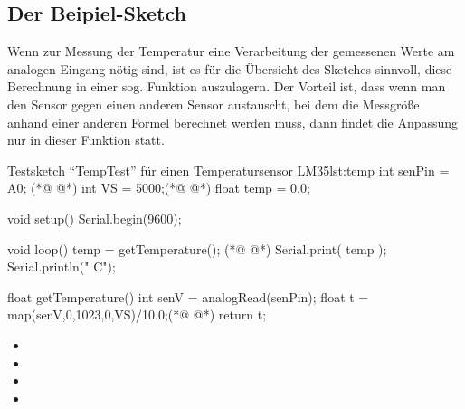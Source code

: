 \subsection{Der Beipiel-Sketch} 

Wenn zur Messung der Temperatur eine Verarbeitung der gemessenen Werte am analogen Eingang nötig sind, ist es für die Übersicht des Sketches sinnvoll, diese Berechnung in einer sog. Funktion auszulagern. Der Vorteil ist, dass wenn man den Sensor gegen einen anderen Sensor austauscht, bei dem die Messgröße anhand einer anderen Formel berechnet werden muss, dann findet die Anpassung nur in dieser Funktion statt.     

\begin{multicols}{2}
\begin{arduinoCode}{Testsketch ``TempTest'' für einen Temperatursensor LM35}{lst:temp}
int senPin = A0; (*@  @*)
int VS = 5000;(*@  @*)
float temp = 0.0; 
 
void setup() {
  Serial.begin(9600);
}
 
void loop() {
  temp =  getTemperature(); (*@  @*)
  Serial.print( temp );
  Serial.println(" C");
}
 
float getTemperature() { 
  int senV = analogRead(senPin); 
  float t = map(senV,0,1023,0,VS)/10.0;(*@ @*)
  return t;
}
\end{arduinoCode}

\vfill\null 
\columnbreak

\null\vfill
\begin{itemize}
  \itemsep15pt
    \item[] 
    \item[] 
    \itemsep35pt
    \item[] 
    \itemsep45pt
    \item[] 
\end{itemize}
\vfill \null



\end{multicols}


